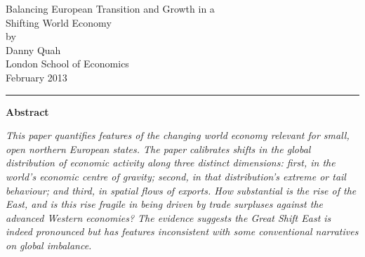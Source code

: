 %
\begin{center}
Balancing European Transition and Growth in a\\
Shifting World Economy\\
by\\
Danny Quah\\
London School of Economics\\
February 2013
\end{center}

\bigskip

\hrule\medskip
\noindent\textbf{\large Abstract}

\noindent\textsl{%
This paper quantifies features of the changing world economy relevant
for small, open northern European states.  The paper calibrates shifts
in the global distribution of economic activity along three distinct
dimensions: first, in the world's economic centre of gravity; second,
in that distribution's extreme or tail behaviour; and third, in
spatial flows of exports.
How substantial is the rise of the East, and is this rise fragile in 
being driven by trade surpluses against the advanced Western economies?
The evidence suggests the Great Shift East is indeed pronounced but has
features inconsistent with some conventional narratives on global
imbalance. 
}
%
